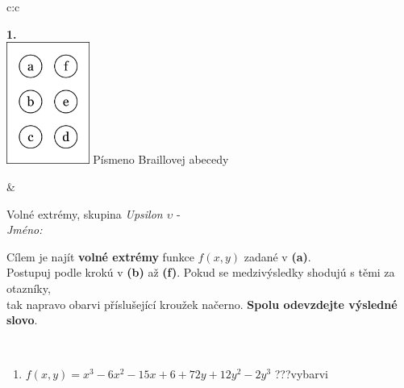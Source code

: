 \documentclass[10pt]{report}
\begin{document}
\begin{tabular}{c:c}
\begin{minipage}[c][104.5mm][t]{0.5\linewidth}
\begin{center}
\begin{minipage}{0.79\linewidth}
\begin{center}
\begin{varwidth}{\linewidth}
\begin{enumerate}
\end{enumerate}
\end{varwidth}
\end{center}
\end{minipage}
\begin{minipage}{0.20\linewidth}
\begin{center}
{\Huge\bfseries 1.} \\[2mm]
\includegraphics[height=40mm]{../images/braille.png}
{\small Písmeno Braillovej abecedy}
\end{center}
\end{minipage}
\end{center}
\end{minipage}
&
\begin{minipage}[c][104.5mm][t]{0.5\linewidth}
\begin{center}
\vspace{7mm}
{\huge Volné extrémy, skupina \textit{Upsilon $\upsilon$} -}\\[5mm]
\textit{Jméno:}\phantom{xxxxxxxxxxxxxxxxxxxxxxxxxxxxxxxxxxxxxxxxxxxxxxxxxxxxxxxxxxxxxxxxx}\\[5mm]
\begin{minipage}{0.95\linewidth}
\begin{center}
Cílem je najít \textbf{volné extrémy} funkce $f(x,y)$ zadané v \textbf{(a)}.\\Postupuj podle krokú v \textbf{(b)} až \textbf{(f)}. Pokud se medzivýsledky shodujú s těmi za otazníky,\\tak napravo obarvi příslušející kroužek načerno. \textbf{Spolu odevzdejte výsledné slovo}.
\end{center}
\end{minipage}
\\[1mm]
\begin{minipage}{0.79\linewidth}
\begin{center}
\begin{varwidth}{\linewidth}
\begin{enumerate}
\normalsize
\item $f(x,y)=x^3-6x^2-15x+6+72y+12y^2-2y^3$\quad \dotfill\; ???\;\dotfill \quad vybarvi

\end{enumerate}
\end{varwidth}
\end{center}
\end{minipage}
\end{center}
\end{minipage}
\end{tabular}
\end{document}
